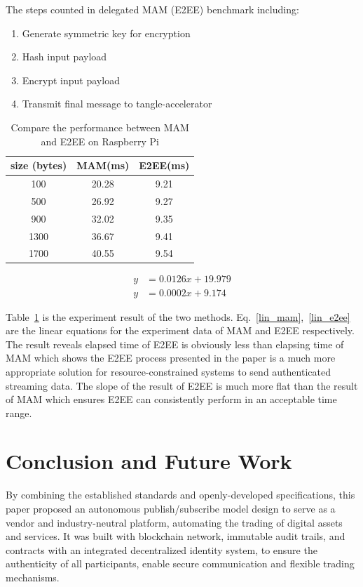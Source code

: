 \documentclass[conference]{IEEEtran}
\begin{document}
The steps counted in delegated MAM (E2EE) benchmark including:
\begin{enumerate}
	\item Generate symmetric key for encryption
	\item Hash input payload
	\item Encrypt input payload
	\item Transmit final message to tangle-accelerator
\end{enumerate}

\begin{table}[htbp]
	\caption{Compare the performance between MAM and E2EE on Raspberry Pi}
    \label{tab:mam_vs_e2ee}
    \centering
        \begin{tabular}{|c||c|c|}
        \hline
            \textbf{size (bytes)} & \textbf{MAM(ms)} & \textbf{E2EE(ms)} \\
            \hline
            100 & 20.28 & 9.21 \\ 
            500 &  26.92 & 9.27 \\ 
            900 & 32.02 &  9.35  \\ 
            1300 & 36.67 & 9.41 \\ 
            1700 & 40.55 & 9.54 \\
            \hline
        \end{tabular}
\end{table}

\begin{align}
    y &= 0.0126 x+19.979 \label{lin_mam} \\
    y &= 0.0002 x+9.174 \label{lin_e2ee}
\end{align}

Table~\ref{tab:mam_vs_e2ee} is the experiment result of the two methods. Eq.~\ref{lin_mam},~\ref{lin_e2ee} are the linear equations for the experiment data of MAM and E2EE respectively. The result reveals elapsed time of E2EE is obviously less than elapsing time of MAM which shows the E2EE process presented in the paper is a much more appropriate solution for resource-constrained systems to send authenticated streaming data. The slope of the result of E2EE is much more flat than the result of MAM which ensures E2EE can consistently perform in an acceptable time range.

\section{Conclusion and Future Work}
\label{section:conclusion}
By combining the established standards and openly-developed specifications, this paper proposed an autonomous publish/subscribe model design to serve as a vendor and industry-neutral platform, automating the trading of digital assets and services. It was built with blockchain network, immutable audit trails, and contracts with an integrated decentralized identity system, to ensure the authenticity of all participants, enable secure communication and flexible trading mechanisms.
\end{document}
